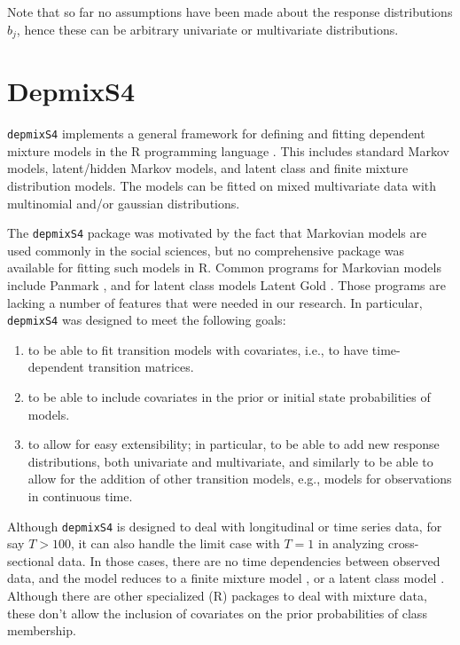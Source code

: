 \documentclass[a4paper,12pt,man,english]{apa} %
\newcommand{\citep}{\cite}
\newcommand{\pkg}{\texttt}
\begin{document}
Note that so far no assumptions have been made about the response
distributions $b_{j}$, hence these can be arbitrary univariate or
multivariate distributions.


\section{DepmixS4}

\pkg{depmixS4} implements a general framework for defining and fitting
dependent mixture models in the R programming language \citep{R2008}.
This includes standard Markov models, latent/hidden Markov models, and
latent class and finite mixture distribution models.  The models can
be fitted on mixed multivariate data with multinomial and/or gaussian
distributions.  

The \pkg{depmixS4} package was motivated by the fact that Markovian
models are used commonly in the social sciences, but no comprehensive
package was available for fitting such models in R. Common programs
for Markovian models include Panmark \citep{Pol1996}, and for latent
class models Latent Gold \citep{Vermunt2003}.  Those programs are
lacking a number of features that were needed in our research.  In
particular, \pkg{depmixS4} was designed to meet the following goals:
\begin{enumerate}

	\item to be able to fit transition models with covariates, i.e.,
	to have time-dependent transition matrices.

	\item to be able to include covariates in the prior or initial
	state probabilities of models.

	\item to allow for easy extensibility; in particular, to be able
	to add new response distributions, both univariate and
	multivariate, and similarly to be able to allow for the addition
	of other transition models, e.g., models for observations in 
	continuous time. 

\end{enumerate}

Although \pkg{depmixS4} is designed to deal with longitudinal or time
series data, for say $T>100$, it can also handle the limit case with
$T=1$ in analyzing cross-sectional data.  In those cases, there are no
time dependencies between observed data, and the model reduces to a
finite mixture model \cite{McLachlan2000}, or a latent class model
\cite{McCutcheon1987}.  Although there are other specialized (R)
packages to deal with mixture data, these don't allow the inclusion of 
covariates on the prior probabilities of class membership.
\end{document}
